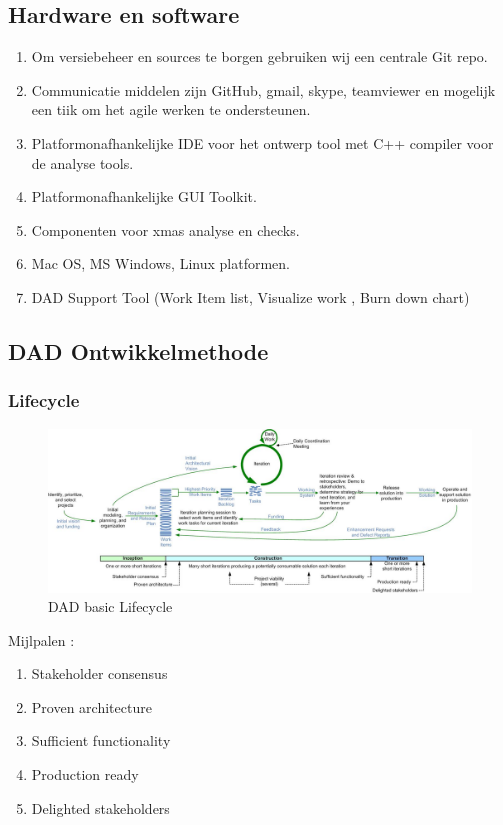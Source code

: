 \subsection{Hardware en software}
\begin{enumerate}
	\item Om versiebeheer en sources te borgen gebruiken wij een centrale Git repo.
	\item Communicatie middelen zijn GitHub, gmail, skype,  teamviewer en mogelijk een tiik om
		het agile werken te ondersteunen.
	\item Platformonafhankelijke IDE voor het ontwerp tool met C++ compiler voor de analyse tools.
	\item Platformonafhankelijke GUI Toolkit.
	\item Componenten voor xmas analyse en checks.
	\item Mac OS,  MS Windows, Linux platformen.
	\item DAD Support Tool (Work Item list, Visualize work , Burn down chart)
\end{enumerate}


\subsection{DAD Ontwikkelmethode}
\subsubsection{Lifecycle}

\begin{figure}
  \includegraphics[width=\textwidth]{dadLifecycleUP2}
  \caption{DAD basic Lifecycle}
\end{figure}
Mijlpalen :
\begin{enumerate}
\item Stakeholder consensus
\item Proven architecture
\item Sufficient functionality
\item Production ready
\item Delighted stakeholders
\end{enumerate}

